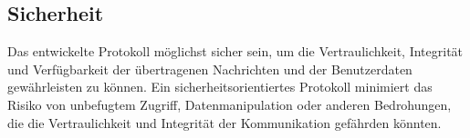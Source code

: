 \subsection{Sicherheit}

Das entwickelte Protokoll möglichst sicher sein, um die Vertraulichkeit, Integrität und Verfügbarkeit der übertragenen Nachrichten und der Benutzerdaten gewährleisten zu können. Ein sicherheitsorientiertes Protokoll minimiert das Risiko von unbefugtem Zugriff, Datenmanipulation oder anderen Bedrohungen, die die Vertraulichkeit und Integrität der Kommunikation gefährden könnten.

